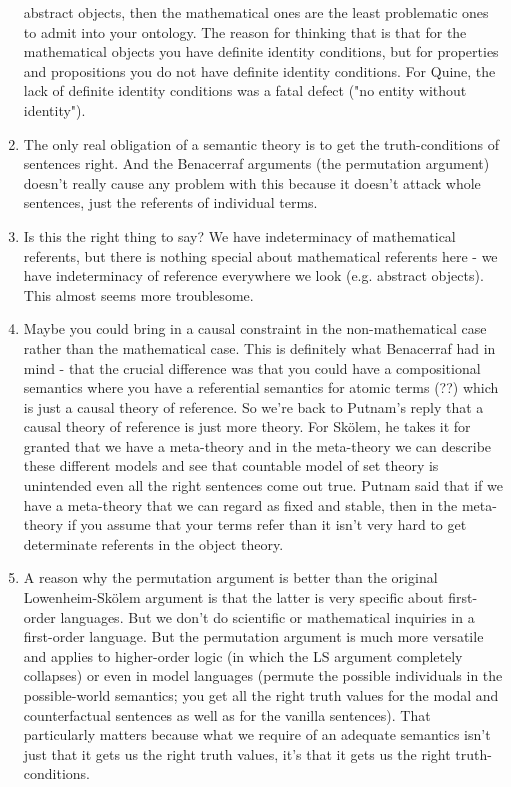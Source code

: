\documentclass[12pt]{article}
\theoremstyle{definition}
\begin{document}
\begin{enumerate}
        abstract objects, then the mathematical ones are the least problematic
        ones to admit into your ontology.  The reason for thinking that is that
        for the mathematical objects you have definite identity conditions, but
        for properties and propositions you do not have definite identity
        conditions. For Quine, the lack of definite identity conditions was a
        fatal defect ("no entity without identity").
    \item
        The only real obligation of a semantic theory is to get the
        truth-conditions of sentences right. And the Benacerraf arguments (the
        permutation argument) doesn't really cause any problem with this
        because it doesn't attack whole sentences, just the referents of
        individual terms.
    \item
        Is this the right thing to say? We have indeterminacy of mathematical
        referents, but there is nothing special about mathematical referents
        here - we have indeterminacy of reference everywhere we look (e.g.
        abstract objects). This almost seems more troublesome.
    \item
        Maybe you could bring in a causal constraint in the non-mathematical
        case rather than the mathematical case. This is definitely what
        Benacerraf had in mind - that the crucial difference was that you could
        have a compositional semantics where you have a referential semantics
        for atomic terms (??) which is just a causal theory of reference. So
        we're back to Putnam's reply that a causal theory of reference is just
        more theory. For Sk\"olem, he takes it for granted that we have a
        meta-theory and in the meta-theory we can describe these different
        models and see that countable model of set theory is unintended even
        all the right sentences come out true. Putnam said that if we have a
        meta-theory that we can regard as fixed and stable, then in the
        meta-theory if you assume that your terms refer than it isn't very hard
        to get determinate referents in the object theory.
    \item
        A reason why the permutation argument is better than the original
        Lowenheim-Sk\"olem argument is that the latter is very specific about
        first-order languages. But we don't do scientific or mathematical
        inquiries in a first-order language. But the permutation argument is
        much more versatile and applies to higher-order logic (in which the LS
        argument completely collapses) or even in model languages (permute the
        possible individuals in the possible-world semantics; you get all the
        right truth values for the modal and counterfactual sentences as well
        as for the vanilla sentences). That particularly matters because what we
        require of an adequate semantics isn't just that it gets us the right
        truth values, it's that it gets us the right truth-conditions.

\end{enumerate}
\end{document}
